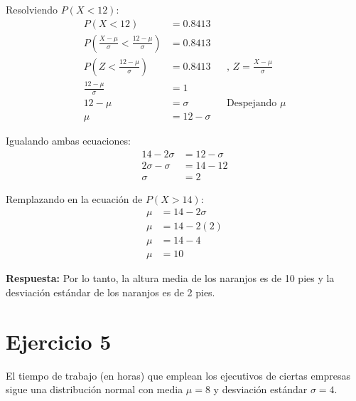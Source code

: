 \documentclass{templateNote}
\begin{document}
Resolviendo $P(X < 12)$:
\begin{align*}
  P(X < 12) &= 0.8413 \\
  P\left(\frac{X - \mu}{\sigma} < \frac{12 - \mu}{\sigma}\right) &= 0.8413 \\
  P\left(Z < \frac{12 - \mu}{\sigma}\right) &= 0.8413 && \text{, } Z = \frac{X - \mu}{\sigma} \\
  \frac{12 - \mu}{\sigma} &= 1 \\
  12 - \mu &= \sigma && \text{Despejando } \mu \\
  \mu &= 12 - \sigma
\end{align*}

\newpage
Igualando ambas ecuaciones:
\begin{align*}
  14 - 2\sigma &= 12 - \sigma \\
  2\sigma - \sigma &= 14 - 12 \\
  \sigma &= 2
\end{align*}

Remplazando en la ecuación de $P(X > 14)$:
\begin{align*}
  \mu &= 14 - 2\sigma \\
  \mu &= 14 - 2(2) \\
  \mu &= 14 - 4 \\
  \mu &= 10
\end{align*}

\textbf{Respuesta:} Por lo tanto, la altura media de los naranjos es de 10 pies y la desviación estándar de los naranjos es de 2 pies.

\section*{Ejercicio 5}
El tiempo de trabajo (en horas) que emplean los ejecutivos de ciertas empresas sigue una distribución normal con media  $\mu = 8$ y desviación estándar  $\sigma = 4$.
\end{document}
